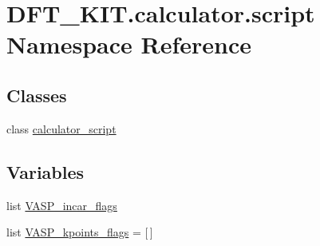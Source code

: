 \hypertarget{namespace_d_f_t___k_i_t_1_1calculator_1_1script}{\section{D\+F\+T\+\_\+\+K\+I\+T.\+calculator.\+script Namespace Reference}
\label{namespace_d_f_t___k_i_t_1_1calculator_1_1script}
}
\subsection*{Classes}
\begin{DoxyCompactItemize}
\item 
class \hyperlink{class_d_f_t___k_i_t_1_1calculator_1_1script_1_1calculator__script}{calculator\+\_\+script}
\end{DoxyCompactItemize}
\subsection*{Variables}
\begin{DoxyCompactItemize}
\item 
list \hyperlink{namespace_d_f_t___k_i_t_1_1calculator_1_1script_a18c2d8c5a8a3cdb3d885e693093e3827}{V\+A\+S\+P\+\_\+incar\+\_\+flags}
\item 
list \hyperlink{namespace_d_f_t___k_i_t_1_1calculator_1_1script_ade8f664e5d6258f0719cf5848ccad9b8}{V\+A\+S\+P\+\_\+kpoints\+\_\+flags} = \mbox{[}$\,$\mbox{]}
\end{DoxyCompactItemize}


